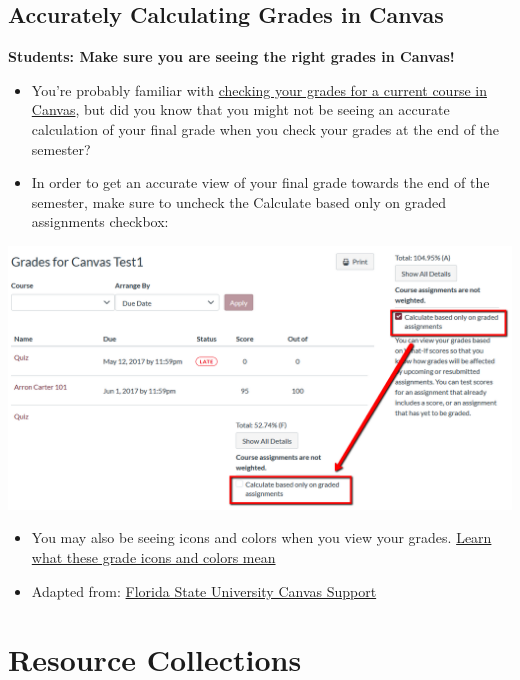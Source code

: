 \hypertarget{accurately-calculating-grades-in-canvas}{%
\subsection{Accurately Calculating Grades in Canvas}\label{accurately-calculating-grades-in-canvas}}

\textbf{Students: Make sure you are seeing the right grades in Canvas!}

\begin{itemize}
\item
  You're probably familiar with \href{https://community.canvaslms.com/t5/Student-Guide/How-do-I-view-my-grades-in-a-current-course/ta-p/493}{checking your grades for a current course in Canvas}, but did you know that you might not be seeing an accurate calculation of your final grade when you check your grades at the end of the semester?
\item
  In order to get an accurate view of your final grade towards the end of the semester, make sure to uncheck the Calculate based only on graded assignments checkbox:
\end{itemize}

\begin{center}\includegraphics[width=0.5\linewidth]{img/grades} \end{center}

\begin{itemize}
\item
  You may also be seeing icons and colors when you view your grades. \href{https://community.canvaslms.com/t5/Student-Guide/How-do-I-use-the-icons-and-colors-in-the-Grades-page/ta-p/476}{Learn what these grade icons and colors mean}
\item
  Adapted from: \href{https://support.canvas.fsu.edu/kb/article/1068-students-make-sure-you-are-seeing-the-right-grades-in-canvas/}{Florida State University Canvas Support}
\end{itemize}

\hypertarget{resource-collections}{%
\section{Resource Collections}\label{resource-collections}}

